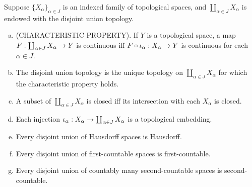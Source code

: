 \documentclass[11pt,a4paper]{article}
\begin{document}
\begin{prop} \label{prop:disjoint_union_topology}
Suppose $\{X_\alpha\}_{\alpha\in J}$ is an indexed family of topological spaces, and $\coprod_{\alpha\in J}X_\alpha$ is endowed with the disjoint union topology.
\begin{enumerate}[(a)]
    \item (CHARACTERISTIC PROPERTY). If $Y$ is a topological space, a map $F:\coprod_{\alpha\in J}X_\alpha\rightarrow Y$ is continuous iff $F\circ\iota_\alpha:X_\alpha\rightarrow Y$ is continuous for each $\alpha\in J$.
    \item The disjoint union topology is the unique topology on $\coprod_{\alpha\in J}X_\alpha$ for which the characteristic property holds.
    \item A subset of $\coprod_{\alpha\in J}X_\alpha$ is closed iff its intersection with each $X_\alpha$ is closed.
    \item Each injection $\iota_\alpha:X_\alpha\rightarrow \coprod_{\alpha\in J}X_\alpha$ is a topological embedding.
    \item Every disjoint union of Hausdorff spaces is Hausdorff.
    \item Every disjoint union of first-countable spaces is first-countable.
    \item Every disjoint union of countably many second-countable spaces is second-countable.
\end{enumerate}
\end{prop}
\end{document}
